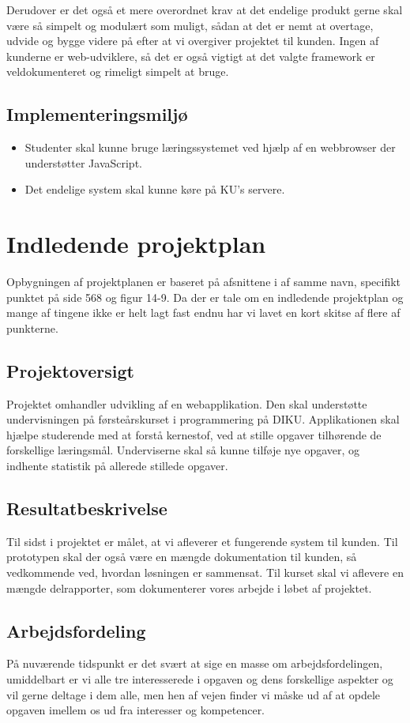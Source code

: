 \documentclass[12pt]{article}
\begin{document}
Derudover er det også et mere overordnet krav at det endelige produkt gerne skal være så simpelt og modulært som muligt, sådan at det er nemt at overtage, udvide og bygge videre på efter at vi overgiver projektet til kunden. Ingen af kunderne er web-udviklere, så det er også vigtigt at det valgte framework er veldokumenteret og rimeligt simpelt at bruge.
\subsection{Implementeringsmiljø}
\begin{itemize}
\item Studenter skal kunne bruge læringssystemet ved hjælp af en webbrowser der understøtter JavaScript.
\item Det endelige system skal kunne køre på KU's servere.
\end{itemize}

\section{Indledende projektplan}
Opbygningen af projektplanen er baseret på afsnittene i \cite{OOSE} af samme navn, specifikt punktet på side 568 og figur 14-9. Da der er tale om en indledende projektplan og mange af tingene ikke er helt lagt fast endnu har vi lavet en kort skitse af flere af punkterne.
\subsection{Projektoversigt}
Projektet omhandler udvikling af en webapplikation. Den skal understøtte undervisningen på førsteårskurset i programmering på DIKU. Applikationen skal hjælpe studerende med at forstå kernestof, ved at stille opgaver tilhørende de forskellige læringsmål. Underviserne skal så kunne tilføje nye opgaver, og indhente statistik på allerede stillede opgaver.
\subsection{Resultatbeskrivelse}
Til sidst i projektet er målet, at vi afleverer et fungerende system til kunden. Til prototypen skal der også være en mængde dokumentation til kunden, så vedkommende ved, hvordan løsningen er sammensat.
Til kurset skal vi aflevere en mængde delrapporter, som dokumenterer vores arbejde i løbet af projektet.
\subsection{Arbejdsfordeling}
På nuværende tidspunkt er det svært at sige en masse om arbejdsfordelingen, umiddelbart er vi alle tre interesserede i opgaven og dens forskellige aspekter og vil gerne deltage i dem alle, men hen af vejen finder vi måske ud af at opdele opgaven imellem os ud fra interesser og kompetencer.
\end{document}
